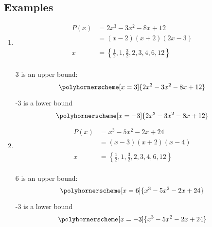 \documentclass{exam}
\begin{document}
  \subsection{Examples}

  \begin{enumerate}
    \item 
      \begin{align*}
        P(x)    &= 2x^3 - 3x^2 - 8x + 12 \\
                &= (x - 2)(x + 2)(2x - 3) \\
        \\
        x       &= \left\{ \frac{1}{2},1,\frac{3}{2},2,3,4,6,12 \right\} \\
      \end{align*}

      3 is an upper bound:
      \[ \polyhornerscheme[x = 3]{2x^3 - 3x^2 - 8x + 12} \]

      -3 is a lower bound
      \[ \polyhornerscheme[x = -3]{2x^3 - 3x^2 - 8x + 12} \]

    \item 
      \begin{align*}
        P(x)    &= x^3 - 5x^2 - 2x + 24 \\
                &= (x - 3)(x + 2)(x - 4) \\
        \\
        x       &= \left\{ \frac{1}{2},1,\frac{3}{2},2,3,4,6,12 \right\} \\
      \end{align*}

      6 is an upper bound:
      \[ \polyhornerscheme[x = 6]{x^3 - 5x^2 - 2x + 24} \]

      -3 is a lower bound
      \[ \polyhornerscheme[x = -3]{x^3 - 5x^2 - 2x + 24} \]

  \end{enumerate}
\end{document}
